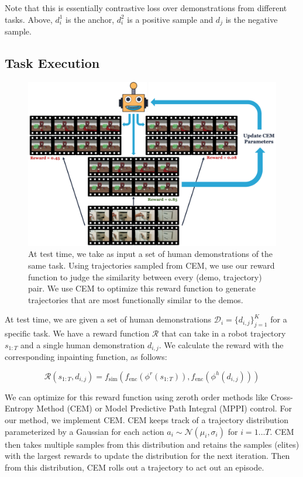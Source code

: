 Note that this is essentially contrastive loss over demonstrations from different tasks. Above, $d_i^1$ is the anchor, $d_i^2$ is a positive sample and $d_j$ is the negative sample.

\subsection{Task Execution}

\begin{figure}[H]
\centering
\includegraphics[width=\linewidth]{figs_reward/method_optimization.pdf}
\vspace{-0.2in}
   \caption{\small At test time, we take as input a set of human demonstrations of the same task. Using trajectories sampled from CEM, we use our reward function to judge the similarity between every (demo, trajectory) pair. We use CEM to optimize this reward function to generate trajectories that are most functionally similar to the demos.}
    \label{fig:method_test}
    \vspace{-0.15in}
\end{figure}

At test time, we are given a set of human demonstrations $\mathcal{D}_i = \{ d_{i,j} \}_{j=1}^K$ for a specific task. We have a reward function $\mathcal{R}$ that can take in a robot trajectory $s_{1:T}$ and a single human demonstration $d_{i, j}$. We calculate the reward with the corresponding inpainting function, as follows:

$$\mathcal{R}(s_{1:T}, d_{i, j}) = f_{\text{sim}}(f_{\text{enc}}(\phi^r(s_{1:T})), f_{\text{enc}}(\phi^h(d_{i, j})))$$

We can optimize for this reward function using zeroth order methods like Cross-Entropy Method (CEM) or Model Predictive Path Integral (MPPI) control. For our method, we implement CEM. CEM keeps track of a trajectory distribution parameterized by a Gaussian for each action $a_i \sim \mathcal{N}(\mu_i, \sigma_i)$ for $i = 1 \dots T$. CEM then takes multiple samples from this distribution and retains the samples (elites) with the largest rewards to update the distribution for the next iteration. Then from this distribution, CEM rolls out a trajectory to act out an episode.

